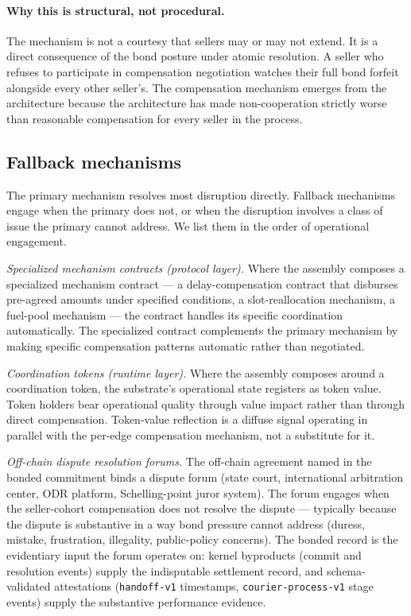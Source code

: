 \documentclass[11pt,a4paper]{article}
\theoremstyle{definition}
\theoremstyle{remark}
\begin{document}
\paragraph{Why this is structural, not procedural.}
The mechanism is not a courtesy that sellers may or may not
extend. It is a direct consequence of the bond posture under
atomic resolution. A seller who refuses to participate in
compensation negotiation watches their full bond forfeit
alongside every other seller's. The compensation mechanism
emerges from the architecture because the architecture has made
non-cooperation strictly worse than reasonable compensation for
every seller in the process.

\subsection{Fallback mechanisms}

The primary mechanism resolves most disruption directly. Fallback
mechanisms engage when the primary does not, or when the
disruption involves a class of issue the primary cannot address.
We list them in the order of operational engagement.

\emph{Specialized mechanism contracts (protocol layer).} Where
the assembly composes a specialized mechanism contract --- a
delay-compensation contract that disburses pre-agreed amounts
under specified conditions, a slot-reallocation mechanism, a
fuel-pool mechanism --- the contract handles its specific
coordination automatically. The specialized contract complements
the primary mechanism by making specific compensation patterns
automatic rather than negotiated.

\emph{Coordination tokens (runtime layer).} Where the assembly
composes around a coordination token, the substrate's operational
state registers as token value. Token holders bear operational
quality through value impact rather than through direct
compensation. Token-value reflection is a diffuse signal
operating in parallel with the per-edge compensation mechanism,
not a substitute for it.

\emph{Off-chain dispute resolution forums.} The off-chain
agreement named in the bonded commitment binds a dispute forum
(state court, international arbitration center, ODR platform,
Schelling-point juror system). The forum engages when the
seller-cohort compensation does not resolve the dispute ---
typically because the dispute is substantive in a way bond
pressure cannot address (duress, mistake, frustration,
illegality, public-policy concerns). The bonded record is the
evidentiary input the forum operates on: kernel byproducts
(commit and resolution events) supply the indisputable settlement
record, and schema-validated attestations (\texttt{handoff-v1}
timestamps, \texttt{courier-process-v1} stage events) supply
the substantive performance evidence.
\end{document}
